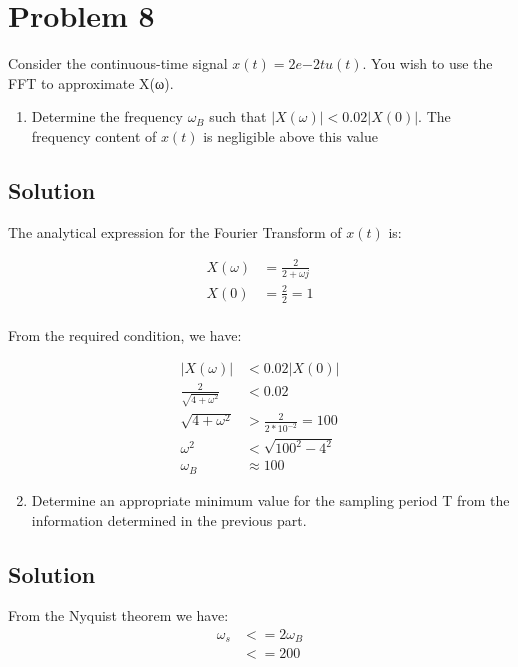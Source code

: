 \section*{Problem 8}

Consider the continuous-time signal $x(t) = 2e{-2t}u(t)$. 
You wish to use the FFT to approximate X(ω).

\begin{enumerate}
\item Determine the frequency $\omega_B$ such that $| X(\omega)|< 0.02|X(0)|$. 
The frequency content of $x(t)$ is negligible above this value
\end{enumerate} 

\subsection*{Solution}

The analytical expression for the Fourier Transform of $x(t)$ is:

\begin{equation*}
\begin{aligned}
X(\omega) &= \frac{2}{2+\omega j} \\
X(0) &= \frac{2}{2} = 1 \\
\end{aligned}
\end{equation*}

From the required condition, we have:

\begin{equation*}
\begin{aligned}
|X(\omega)| &< 0.02 |X(0)| \\
\frac{2}{\sqrt{4 + \omega^2}} &< 0.02\\
\sqrt{4+\omega^2} &> \frac{2}{2*10^{-2}} = 100 \\
\omega^2 &< \sqrt{100^2-4^2} \\
\omega_B &\approx 100
\end{aligned}
\end{equation*} 

\begin{enumerate}
\setcounter{enumi}{1}
\item Determine an appropriate minimum value for the sampling period T 
from the information determined in the previous part.
\end{enumerate} 

\subsection*{Solution}
From the Nyquist theorem we have:
\begin{equation*}
\begin{aligned}
\omega_s &<= 2 \omega_B \\
&<= 200 \\
\end{aligned}
\end{equation*} 

